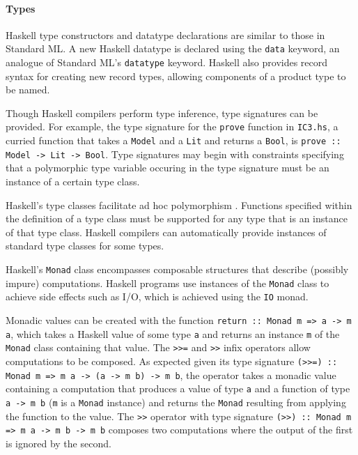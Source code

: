 \documentclass[12pt,a4paper,twoside,openright]{report}
\begin{document}
\paragraph{Types}{
Haskell type constructors and datatype declarations are similar to those in
Standard ML. A new Haskell datatype is declared using the \verb,data, keyword, an analogue
of Standard ML's \verb,datatype, keyword.
Haskell also provides record syntax for creating new record types, allowing components
of a product type to be named.

Though Haskell compilers perform type inference, type
signatures can be provided. For example, the type signature for
the \verb,prove, function in \verb,IC3.hs,, a curried function that takes
a \verb,Model, and a \verb,Lit, and returns a \verb,Bool,,
is \verb,prove :: Model -> Lit -> Bool,. Type signatures may begin with
constraints specifying that a polymorphic type variable occuring in the type
signature must be an instance of a certain type class.


Haskell's type classes facilitate ad hoc polymorphism \cite{hall94}.
Functions specified within the definition of a type class
must be supported for any type that is an instance of that type class.
Haskell compilers can automatically provide instances of standard
type classes for some types.

Haskell's \verb,Monad, class encompasses composable
structures that describe (possibly impure) computations.
Haskell programs use instances of the
\verb,Monad, class to achieve side effects such as I/O, which is
achieved using the \verb,IO, monad.

Monadic values can be created with the function
\verb,return :: Monad m => a -> m a,, which takes a Haskell
value of some type \verb,a, and returns an instance \verb,m, of the
\verb,Monad, class containing that value.
The \verb,>>=, and \verb,>>, infix operators allow computations to be composed.
As expected given its type signature
\verb,(>>=) :: Monad m => m a -> (a -> m b) -> m b,, the operator
takes a monadic value containing a computation that produces a value of type
\verb,a, and a function of type \verb,a -> m b, (\verb,m, is a \verb,Monad, instance)
and returns the \verb,Monad, resulting from applying the function to the value.
The \verb,>>, operator with type signature
\verb,(>>) :: Monad m => m a -> m b -> m b, composes two computations where
the output of the first is ignored by the second.

}
\end{document}
